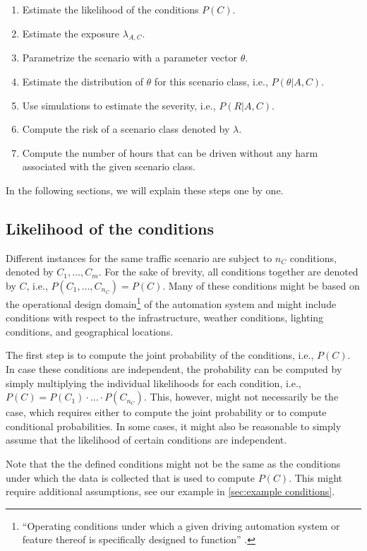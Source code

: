 \begin{enumerate}
	\item Estimate the likelihood of the conditions $P(C)$.
	\item Estimate the exposure $\lambda_{A,C}$.
	\item Parametrize the scenario with a parameter vector $\theta$.
	\item Estimate the distribution of $\theta$ for this scenario class, i.e., $P(\theta|A,C)$.
	\item Use simulations to estimate the severity, i.e., $P(R|A,C)$.
	\item Compute the risk of a scenario class denoted by $\lambda$.
	\item Compute the number of hours that can be driven without any harm associated with the given scenario class.
\end{enumerate}

In the following sections, we will explain these steps one by one. 



\subsection{Likelihood of the conditions}
\label{sec:conditions}

Different instances for the same traffic scenario are subject to $n_C$ conditions, denoted by $C_1, \ldots, C_m$. For the sake of brevity, all conditions together are denoted by $C$, i.e., $P(C_1, \ldots, C_{n_C})=P(C)$. Many of these conditions might be based on the operational design domain\footnote{``Operating conditions under which a given driving automation system or feature thereof is specifically designed to function'' \cite{sea2018j3016}.} of the automation system and might include conditions with respect to the infrastructure, weather conditions, lighting conditions, and geographical locations. 

The first step is to compute the joint probability of the conditions, i.e., $P(C)$. In case these conditions are independent, the probability can be computed by simply multiplying the individual likelihoods for each condition, i.e., $P(C)=P(C_1)\cdot\ldots\cdot P(C_{n_C})$. This, however, might not necessarily be the case, which requires either to compute the joint probability or to compute conditional probabilities. In some cases, it might also be reasonable to simply assume that the likelihood of certain conditions are independent.

Note that the the defined conditions might not be the same as the conditions under which the data is collected that is used to compute $P(C)$. This might require additional assumptions, see our example in \cref{sec:example conditions}.



